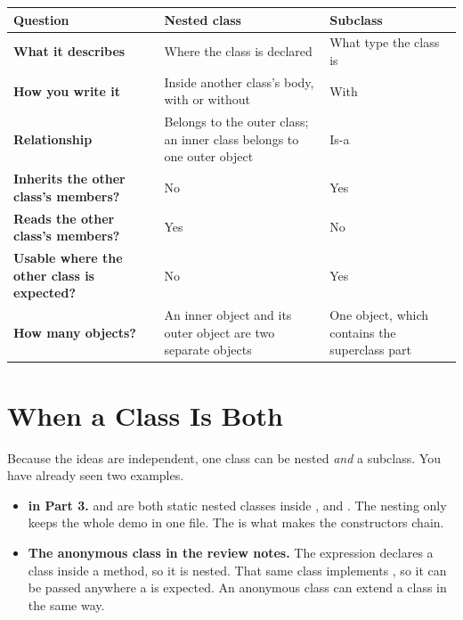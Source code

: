 \documentclass[11pt]{article}
\begin{document}
\begin{classtable}
\renewcommand{\arraystretch}{1.3}
\begin{tabular}{>{\bfseries}L{1.9in} L{2.1in} L{2.0in}}
\toprule
{}
Question & Nested class & Subclass \\
\midrule
What it describes & Where the class is declared & What type the class is \\
How you write it & Inside another class's body, with or without  & With  \\
Relationship & Belongs to the outer class; an inner class belongs to one outer object & Is-a \\
Inherits the other class's members? & No & Yes \\
Reads the other class's  members? & Yes & No \\
Usable where the other class is expected? & No & Yes \\
How many objects? & An inner object and its outer object are two separate objects & One object, which contains the superclass part \\
\bottomrule
\end{tabular}
\end{classtable}

\section{When a Class Is Both}

Because the ideas are independent, one class can be nested \emph{and} a subclass. You have already
seen two examples.

\begin{itemize}[leftmargin=1.4em]
  \item \textbf{ in Part 3.}  and  are both static
        nested classes inside , and . The
        nesting only keeps the whole demo in one file. The  is what makes the
        constructors chain.
  \item \textbf{The anonymous class in the review notes.} The expression
         declares a class inside a method, so it is nested. That
        same class implements , so it can be passed anywhere a
         is expected. An anonymous class can extend a class in the same way.
\end{itemize}
\end{document}
